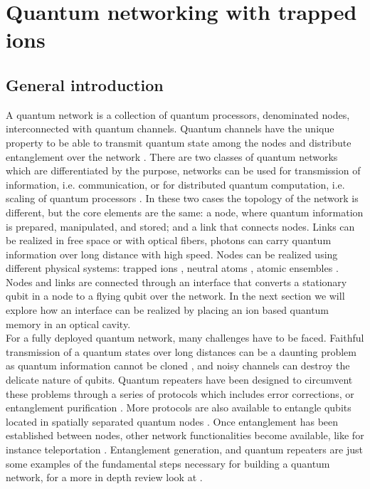 \section{Quantum networking with trapped ions}
\subsection{General introduction}
A quantum network is a collection of quantum processors, denominated nodes, interconnected with quantum channels. Quantum channels have the unique property to be able to transmit quantum state among the nodes and distribute entanglement over the network \cite{kimble}. There are two classes of quantum networks which are differentiated by the purpose, networks can be used for transmission of information, i.e. communication, or for distributed quantum computation, i.e. scaling of quantum processors \cite{ion_quantumnetwork}.
In these two cases the topology of the network is different, but the core elements are the same: a node, where quantum information is prepared, manipulated, and stored; and a link that connects nodes. Links can be realized in free space \cite{Hughes2002} or with optical fibers, photons can carry quantum information over long distance with high speed. Nodes can be realized using different physical systems: trapped ions \cite{ion_quantumnetwork}, neutral atoms \cite{Ritter2012}, atomic ensembles \cite{kimble}. Nodes and links are connected through an interface that converts a stationary qubit in a node to a flying qubit over the network.  In the next section we will explore how an interface can be realized by placing an ion based quantum memory in an optical cavity.\\
For a fully deployed quantum network, many challenges have to be faced. Faithful transmission of a quantum states over long distances can be a daunting problem as quantum information cannot be cloned \cite{nocloning}, and noisy channels can destroy the delicate nature of qubits. Quantum repeaters have been designed \cite{quantumrepeters} to circumvent these problems through a series of protocols which includes error corrections, or entanglement purification \cite{Pan2001}. More protocols are also available to  entangle qubits located in spatially separated quantum nodes \cite{Duan2001}. Once entanglement has been established between nodes, other network functionalities become available, like for instance teleportation \cite{PhysRevLett.70.1895}. Entanglement generation, and quantum repeaters are just some examples of the fundamental steps necessary for building a quantum network, for a more in depth review look at \cite{Wehnereaam9288}.


